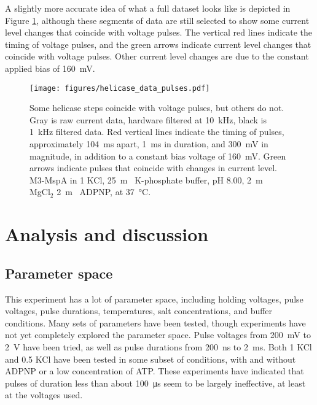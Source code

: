 A slightly more accurate idea of what a full dataset looks like is depicted in Figure \ref{fig:helicase_pulse_traces}, although these segments of data are still selected to show some current level changes that coincide with voltage pulses.  The vertical red lines indicate the timing of voltage pulses, and the green arrows indicate current level changes that coincide with voltage pulses.  Other current level changes are due to the constant applied bias of \SI{160}{\mV}.

\begin{figure}[h]
\begin{centering}
\texttt{[image: figures/helicase\_data\_pulses.pdf]}
\caption[A fraction of pulses move the helicase]{Some helicase steps coincide with voltage pulses, but others do not.  Gray is raw current data, hardware filtered at \SI{10}{\kHz}, black is \SI{1}{\kHz} filtered data.  Red vertical lines indicate the timing of pulses, approximately \SI{104}{\ms} apart, \SI{1}{\ms} in duration, and \SI{300}{\mV} in magnitude, in addition to a constant bias voltage of \SI{160}{\mV}.  Green arrows indicate pulses that coincide with changes in current level. M3-MspA in \SI{1}{\Molar} KCl, \SI{25}{\m\Molar} K-phosphate buffer, pH \num{8.00}, \SI{2}{\m\Molar} MgCl$_2$ \SI{2}{\m\Molar} ADPNP, at \SI{37}{\celsius}.}
\label{fig:helicase_pulse_traces}
\end{centering}
\end{figure}

\section{Analysis and discussion}

\subsection{Parameter space}

This experiment has a lot of parameter space, including holding voltages, pulse voltages, pulse durations, temperatures, salt concentrations, and buffer conditions.  Many sets of parameters have been tested, though experiments have not yet completely explored the parameter space.  Pulse voltages from \SI{200}{\mV} to \SI{2}{\V} have been tried, as well as pulse durations from \SI{200}{\ns} to \SI{2}{\ms}.  Both \SI{1}{\Molar} KCl and \SI{0.5}{\Molar} KCl have been tested in some subset of conditions, with and without ADPNP or a low concentration of ATP.  These experiments have indicated that pulses of duration less than about \SI{100}{\micro\s} seem to be largely ineffective, at least at the voltages used.

